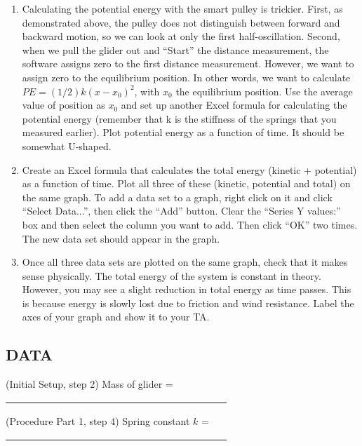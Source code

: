 \begin{enumerate}[label=\arabic*.]
\item Calculating the potential energy with the smart pulley is trickier.  First, as demonstrated above, the pulley does not distinguish between forward and backward motion, so we can look at only the first half-oscillation.  Second, when we pull the glider out and ``Start'' the distance measurement, the software assigns zero to the first distance measurement.  However, we want to assign zero to the equilibrium position.  In other words, we want to calculate \(PE = (1/2)k(x-x_0)^2\), with \(x_0\) the equilibrium position.  Use the average value of position as \(x_0\) and set up another Excel formula for calculating the potential energy (remember that k is the stiffness of the springs that you measured earlier).  Plot potential energy as a function of time.  It should be somewhat U-shaped.  

\item Create an Excel formula that calculates the total energy (kinetic + potential) as a function of time.  Plot all three of these (kinetic, potential and total) on the same graph.  To add a data set to a graph, right click on it and click ``Select Data...'', then click the ``Add'' button.  Clear the ``Series Y values:'' box and then select the column you want to add.  Then click ``OK'' two times.  The new data set should appear in the graph.

\item Once all three data sets are plotted on the same graph, check that it makes sense physically.  The total energy of the system is constant in theory.  However, you may see a slight reduction in total energy as time passes.  This is because energy is slowly lost due to friction and wind resistance.  Label the axes of your graph and show it to your TA.

\end{enumerate}

\subsection*{DATA}

\vphantom{.}
\squishlist

\item (Initial Setup, step 2) Mass of glider = \ul{~~~~~~~~~~~~~~~~~~~~~~~~~~~~~~~~~~~~~~~~~~~~~}

\item (Procedure Part 1, step 4) Spring constant \(k\) = \ul{~~~~~~~~~~~~~~~~~~~~~~~~~~~~~~~~~~~~~~~~~~~~~}

